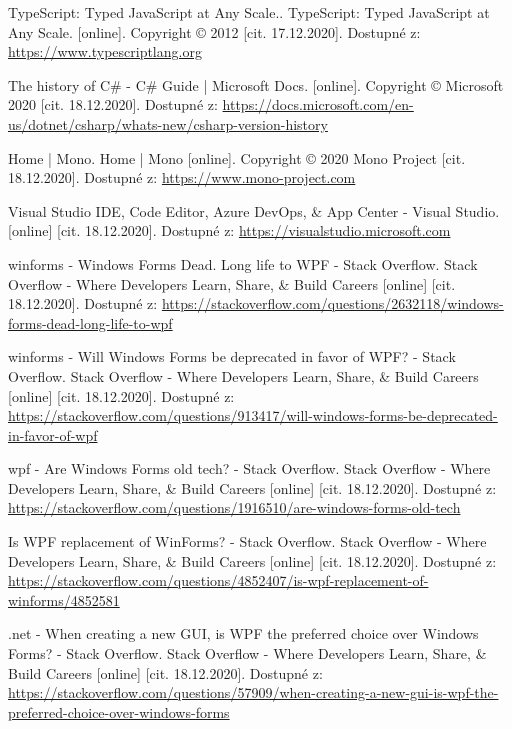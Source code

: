 \begin{thebibliography}{99}
 TypeScript: Typed JavaScript at Any Scale.. TypeScript: Typed JavaScript at Any Scale. [online]. Copyright © 2012 [cit. 17.12.2020]. Dostupné z: \url{https://www.typescriptlang.org}

The history of C\# - C\# Guide | Microsoft Docs. [online]. Copyright © Microsoft 2020 [cit. 18.12.2020]. Dostupné z: \url{https://docs.microsoft.com/en-us/dotnet/csharp/whats-new/csharp-version-history}

Home | Mono. Home | Mono [online]. Copyright © 2020 Mono Project [cit. 18.12.2020]. Dostupné z: \url{https://www.mono-project.com}

Visual Studio IDE, Code Editor, Azure DevOps, \& App Center - Visual Studio. [online] [cit. 18.12.2020]. Dostupné z: \url{https://visualstudio.microsoft.com}

winforms - Windows Forms Dead. Long life to WPF - Stack Overflow. Stack Overflow - Where Developers Learn, Share, \& Build Careers [online] [cit. 18.12.2020]. Dostupné z: \url{https://stackoverflow.com/questions/2632118/windows-forms-dead-long-life-to-wpf}

winforms - Will Windows Forms be deprecated in favor of WPF? - Stack Overflow. Stack Overflow - Where Developers Learn, Share, \& Build Careers [online] [cit. 18.12.2020]. Dostupné z: \url{https://stackoverflow.com/questions/913417/will-windows-forms-be-deprecated-in-favor-of-wpf}

wpf - Are Windows Forms old tech? - Stack Overflow. Stack Overflow - Where Developers Learn, Share, \& Build Careers [online] [cit. 18.12.2020]. Dostupné z: \url{https://stackoverflow.com/questions/1916510/are-windows-forms-old-tech}

Is WPF replacement of WinForms? - Stack Overflow. Stack Overflow - Where Developers Learn, Share, \& Build Careers [online] [cit. 18.12.2020]. Dostupné z: \url{https://stackoverflow.com/questions/4852407/is-wpf-replacement-of-winforms/4852581}

.net - When creating a new GUI, is WPF the preferred choice over Windows Forms? - Stack Overflow. Stack Overflow - Where Developers Learn, Share, \& Build Careers [online] [cit. 18.12.2020]. Dostupné z: \url{https://stackoverflow.com/questions/57909/when-creating-a-new-gui-is-wpf-the-preferred-choice-over-windows-forms}


\end{thebibliography}
